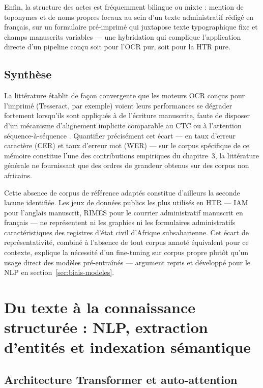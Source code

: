 Enfin, la structure des actes est fréquemment bilingue ou mixte : mention de toponymes et de noms propres locaux au sein d'un texte administratif rédigé en français, sur un formulaire pré-imprimé qui juxtapose texte typographique fixe et champs manuscrits variables --- une hybridation qui complique l'application directe d'un pipeline conçu soit pour l'OCR pur, soit pour la HTR pure.

\subsection{Synthèse}
\label{sec:synthese-htr}

La littérature établit de façon convergente que les moteurs OCR conçus pour l'imprimé (Tesseract, par exemple) voient leurs performances se dégrader fortement lorsqu'ils sont appliqués à de l'écriture manuscrite, faute de disposer d'un mécanisme d'alignement implicite comparable au CTC ou à l'attention séquence-à-séquence \cite{Plamondon2000OnLineAO}.
Quantifier précisément cet écart --- en taux d'erreur caractère (CER) et taux d'erreur mot (WER) --- sur le corpus spécifique de ce mémoire constitue l'une des contributions empiriques du chapitre~3, la littérature générale ne fournissant que des ordres de grandeur obtenus sur des corpus non africains.

Cette absence de corpus de référence adaptés constitue d'ailleurs la seconde lacune identifiée.
Les jeux de données publics les plus utilisés en HTR --- IAM pour l'anglais manuscrit, RIMES pour le courrier administratif manuscrit en français \cite{grosicki2011rimes} --- ne représentent ni les graphies ni les formulaires administratifs caractéristiques des registres d'état civil d'Afrique subsaharienne.
Cet écart de représentativité, combiné à l'absence de tout corpus annoté équivalent pour ce contexte, explique la nécessité d'un fine-tuning sur corpus propre plutôt qu'un usage direct des modèles pré-entraînés --- argument repris et développé pour le NLP en section~\ref{sec:biais-modeles}.

\section{Du texte à la connaissance structurée : NLP, extraction d'entités et indexation sémantique}
\label{sec:nlp-indexation}

\subsection{Architecture Transformer et auto-attention}
\label{sec:transformer-attention}

